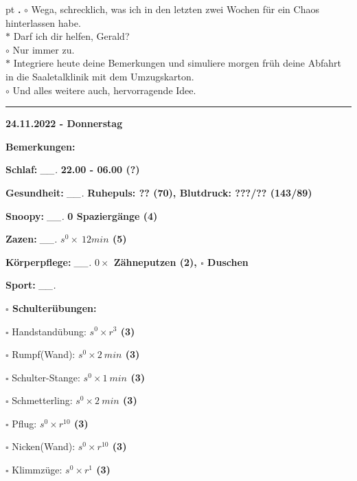 \documentclass[10pt,a4paper]{article}
\newcounter{notec}
\newcommand\notep[1]{%
  \stepcounter{notec}
  \vskip #1pt
  {\bf\arabic{notec}.}
}
\newcommand\prop[1] {{\color {alizarin} {\bf #1}}}             %
\newcommand\mand[1] {{\color {burntorange} {\bf #1}}}          %
\newcommand\ddivide {\vskip -9pt \hrule \vskip 6pt}
\newcommand\topspace{\vskip -15pt \hskip 20pt}
\newcommand\n[1] { {\sl #1.} \hskip 5pt }
\begin{document}
\begin{mdframed}[style=daystyle]
  \notep 4 $\circ$ Wega, schrecklich, was ich in den letzten zwei Wochen für ein
  Chaos hinterlassen habe. \\
  $\ast$ Darf ich dir helfen, Gerald? \\
  $\circ$ Nur immer zu. \\
  $\ast$ Integriere heute deine Bemerkungen und simuliere morgen früh deine
  Abfahrt in die Saaletalklinik mit dem Umzugskarton. \\
  $\circ$ Und alles weitere auch, hervorragende Idee.

\end{mdframed}


\ddivide
{\prop {24.11.2022 - Donnerstag}}

\begin{mdframed}[style=daystyle]
  \begin{labeling}{{\mand {Bemerkungen:}}}
    \setlength\itemsep{-3pt}
  \item[{\mand {Schlaf:}}]       \n{\_\_} {\prop {22.00 - 06.00 (?)}}
  \item[{\mand {Gesundheit:}}]   \n{\_\_} {\prop {Ruhepuls: ?? (70), Blutdruck: ???/?? (143/89)}}
  \item[{\mand {Snoopy:}}]       \n{\_\_} {\prop {0 Spaziergänge (4)}}    
  \item[{\mand {Zazen:}}]        \n{\_\_} {\prop {$s^0 \times\ 12 min$ (5)}}
  \item[{\mand {Körperpflege:}}] \n{\_\_} {\prop {$0 \times$ Zähneputzen (2), $\square$ Duschen}}
  \item[{\mand {Sport:}}]        \n{\_\_}
    \topspace
    \begin{minipage}{0.75\textwidth}  
      \begin{labeling}{\prop {$\square$ {Schulterübungen:}}} 
        \setlength\itemsep{-3pt}
      \item[$\square$ Handstandübung:]  {\prop {$s^0 \times r^{3}$ (3)}}
      \item[$\square$ Rumpf(Wand):]     {\prop {$s^0 \times 2\ min$ (3)}}
      \item[$\square$ Schulter-Stange:] {\prop {$s^0 \times 1\ min$ (3)}}
      \item[$\square$ Schmetterling:]   {\prop {$s^0 \times 2\ min$ (3)}}
      \item[$\square$ Pflug:]           {\prop {$s^0 \times r^{10}$ (3)}}
      \item[$\square$ Nicken(Wand):]    {\prop {$s^0 \times r^{10}$ (3)}}
      \item[$\square$ Klimmzüge:]       {\prop {$s^0 \times r^1$ (3)}}

\end{labeling}
\end{minipage}
\end{labeling}
\end{mdframed}
\end{document}
